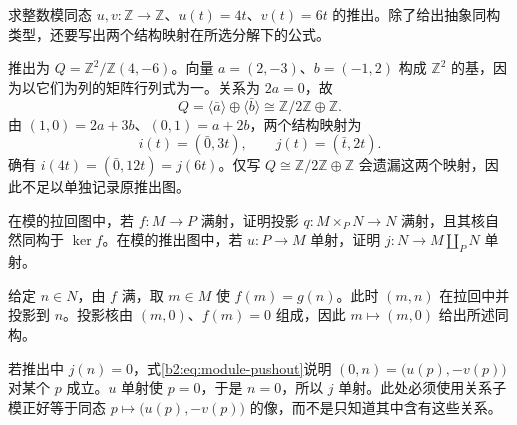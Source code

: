\begin{exercise}\label{b2:ex:05-pushout-torsion}
	求整数模同态 \(u,v:\mathbb Z\rightarrow\mathbb Z\)、\(u(t)=4t\)、\(v(t)=6t\) 的推出。除了给出抽象同构类型，还要写出两个结构映射在所选分解下的公式。
\end{exercise}
\begin{solution}
	推出为 \(Q=\mathbb Z^2/\mathbb Z(4,-6)\)。向量 \(a=(2,-3)\)、\(b=(-1,2)\) 构成 \(\mathbb Z^2\) 的基，因为以它们为列的矩阵行列式为一。关系为 \(2a=0\)，故
	\[
		Q=\langle\bar a\rangle\oplus\langle\bar b\rangle \cong\mathbb Z/2\mathbb Z\oplus\mathbb Z.
	\]
	由 \((1,0)=2a+3b\)、\((0,1)=a+2b\)，两个结构映射为
	\[
		i(t)=(\bar0,3t),\qquad j(t)=(\bar t,2t).
	\]
	确有 \(i(4t)=(\bar0,12t)=j(6t)\)。仅写 \(Q\cong\mathbb Z/2\mathbb Z\oplus\mathbb Z\) 会遗漏这两个映射，因此不足以单独记录原推出图。
\end{solution}

\begin{exercise}\label{b2:ex:05-pullback-surjection-pushout-injection}
	在模的拉回图中，若 \(f:M\rightarrow P\) 满射，证明投影 \(q:M\times_PN\rightarrow N\) 满射，且其核自然同构于 \(\ker f\)。在模的推出图中，若 \(u:P\rightarrow M\) 单射，证明 \(j:N\rightarrow M\amalg_PN\) 单射。
\end{exercise}
\begin{solution}
	给定 \(n\in N\)，由 \(f\) 满，取 \(m\in M\) 使 \(f(m)=g(n)\)。此时 \((m,n)\) 在拉回中并投影到 \(n\)。投影核由 \((m,0)\)、\(f(m)=0\) 组成，因此 \(m\mapsto(m,0)\) 给出所述同构。

	若推出中 \(j(n)=0\)，式\eqref{b2:eq:module-pushout}说明 \((0,n)=\bigl(u(p),-v(p)\bigr)\) 对某个 \(p\) 成立。\(u\) 单射使 \(p=0\)，于是 \(n=0\)，所以 \(j\) 单射。此处必须使用关系子模正好等于同态 \(p\mapsto\bigl(u(p),-v(p)\bigr)\) 的像，而不是只知道其中含有这些关系。
\end{solution}

